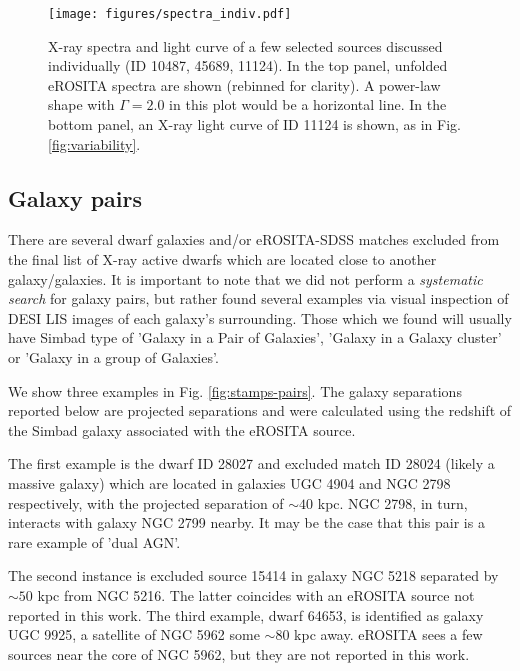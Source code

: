 \documentclass[fleqn,usenatbib]{mnras}
\newcommand{\sbyk}[1]{\textcolor{OliveGreen}{{SB: \bf||#1||}}}
\begin{document}
\begin{figure}
    \texttt{[image: figures/spectra\_indiv.pdf]}
    \caption[X-ray spectra and light curve of a few selected active dwarf galaxies]{X-ray spectra and light curve of a few selected sources discussed individually (ID 10487, 45689, 11124). In the top panel, unfolded eROSITA spectra are shown (rebinned for clarity). A power-law shape with $\Gamma=2.0$ in this plot would be a horizontal line. In the bottom panel, an X-ray light curve of ID 11124 is shown, as in Fig. \ref{fig:variability}.}
    \label{fig:indiv-spe-lc}
\end{figure}




\subsection{Galaxy pairs}
\label{sect:indiv:pairs}
There are several dwarf galaxies and/or eROSITA-SDSS matches excluded from the final list of X-ray active dwarfs which are located  close to another galaxy/galaxies.  It is important to note that we did not perform a \textit{systematic search} for galaxy pairs, but rather found several examples via visual inspection of DESI LIS images of each galaxy's surrounding. Those which we found will usually have Simbad type of 'Galaxy in a Pair of Galaxies', 'Galaxy in a Galaxy cluster' or 'Galaxy in a group of Galaxies'.   %

We show three examples in Fig. \ref{fig:stamps-pairs}. The galaxy separations reported below are projected separations and were calculated using the redshift of the Simbad galaxy associated with the eROSITA source.

The first example is the dwarf ID 28027 and excluded match  ID 28024 (likely a massive galaxy) which are located in galaxies UGC 4904 and NGC 2798 respectively, with the projected separation of $\sim40$ kpc. NGC 2798, in turn, interacts with galaxy NGC 2799 nearby. It may be the case that this pair is a rare example of 'dual AGN'. 

The second instance is excluded source 15414 in  galaxy NGC 5218 separated by $\sim50$ kpc from NGC 5216. The latter coincides with an eROSITA source not reported in this work. The third example, dwarf 64653, is identified as galaxy UGC 9925, a satellite of NGC 5962 \citep{Mao2021} some $\sim80$ kpc away. eROSITA sees a few sources near the core of NGC 5962, but they are not reported in this work.  
\end{document}
